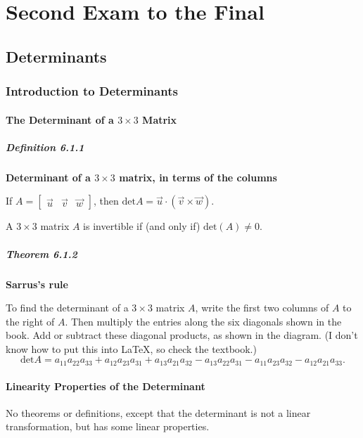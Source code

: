 \documentclass{report}
\begin{document}
\part{Second Exam to the Final}

\chapter{Determinants}

\section{Introduction to Determinants}
\subsection*{The Determinant of a $3\times{}3$ Matrix}
\subsubsection*{Definition 6.1.1}
\par\noindent\textbf{Determinant of a $3\times{}3$ matrix, in terms of the columns}
\par\noindent If $\displaystyle A=\left[\begin{array}{ccc}\vec{u}&\vec{v}&\vec{w}\end{array}\right]$, then $\textrm{det}A=\vec{u}\cdot{}(\vec{v}\times{}\vec{w})$.
\par\noindent A $3\times{}3$ matrix $A$ is invertible if (and only if) $\textrm{det}(A)\ne{}0$.
\subsubsection*{Theorem 6.1.2}
\par\noindent\textbf{Sarrus's rule}
\par\noindent To find the determinant of a $3\times{}3$ matrix $A$, write the first two columns of $A$ to the right of $A$. Then multiply the entries along the six diagonals shown in the book. Add or subtract these diagonal products, as shown in the diagram. (I don't know how to put this into LaTeX, so check the textbook.)
\[\textrm{det}A=a_{11}a_{22}a_{33}+a_{12}a_{23}a_{31}+a_{13}a_{21}a_{32}-a_{13}a_{22}a_{31}-a_{11}a_{23}a_{32}-a_{12}a_{21}a_{33}.\]
\subsection*{Linearity Properties of the Determinant}
No theorems or definitions, except that the determinant is not a linear transformation, but has some linear properties.
\end{document}
